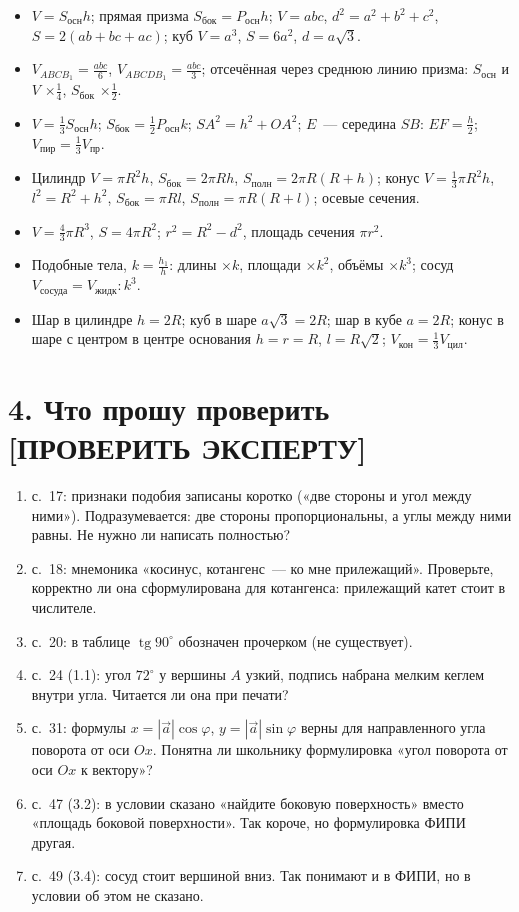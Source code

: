 \documentclass[fontsize=10pt]{scrartcl}
\newcommand{\chk}{\textbf{[ПРОВЕРИТЬ ЭКСПЕРТУ]}}
\begin{document}
\begin{itemize}
\item[с.~39] $V=S_{\text{осн}}h$; прямая призма $S_{\text{бок}}=P_{\text{осн}}h$; $V=abc$, $d^2=a^2+b^2+c^2$, $S=2(ab+bc+ac)$; куб $V=a^3$, $S=6a^2$, $d=a\sqrt3$.
\item[с.~40] $V_{ABCB_1}=\tfrac{abc}6$, $V_{ABCDB_1}=\tfrac{abc}3$; отсечённая через среднюю линию призма: $S_{\text{осн}}$ и $V$ $\times\tfrac14$, $S_{\text{бок}}$ $\times\tfrac12$.
\item[с.~41] $V=\tfrac13S_{\text{осн}}h$; $S_{\text{бок}}=\tfrac12P_{\text{осн}}k$; $SA^2=h^2+OA^2$; $E$~— середина $SB$: $EF=\tfrac h2$; $V_{\text{пир}}=\tfrac13V_{\text{пр}}$.
\item[с.~42] Цилиндр $V=\pi R^2h$, $S_{\text{бок}}=2\pi Rh$, $S_{\text{полн}}=2\pi R(R+h)$; конус $V=\tfrac13\pi R^2h$, $l^2=R^2+h^2$, $S_{\text{бок}}=\pi Rl$, $S_{\text{полн}}=\pi R(R+l)$; осевые сечения.
\item[с.~43] $V=\tfrac43\pi R^3$, $S=4\pi R^2$; $r^2=R^2-d^2$, площадь сечения $\pi r^2$.
\item[с.~44] Подобные тела, $k=\tfrac{h_1}h$: длины $\times k$, площади $\times k^2$, объёмы $\times k^3$; сосуд $V_{\text{сосуда}}=V_{\text{жидк}}:k^3$.
\item[с.~45] Шар в цилиндре $h=2R$; куб в шаре $a\sqrt3=2R$; шар в кубе $a=2R$; конус в шаре с центром в центре основания $h=r=R$, $l=R\sqrt2$; $V_{\text{кон}}=\tfrac13V_{\text{цил}}$.
\end{itemize}

\section*{4. Что прошу проверить \chk}
\begin{enumerate}[leftmargin=7mm]
\item с.~17: признаки подобия записаны коротко («две стороны и угол между ними»). Подразумевается: две стороны пропорциональны, а углы между ними равны. Не нужно ли написать полностью?
\item с.~18: мнемоника «косинус, котангенс~— ко мне прилежащий». Проверьте, корректно ли она сформулирована для котангенса: прилежащий катет стоит в числителе.
\item с.~20: в таблице $\operatorname{tg}90^\circ$ обозначен прочерком (не существует).
\item с.~24 (1.1): угол $72^\circ$ у вершины $A$ узкий, подпись набрана мелким кеглем внутри угла. Читается ли она при печати?
\item с.~31: формулы $x=|\vec a|\cos\varphi$, $y=|\vec a|\sin\varphi$ верны для направленного угла поворота от оси $Ox$. Понятна ли школьнику формулировка «угол поворота от оси $Ox$ к вектору»?
\item с.~47 (3.2): в условии сказано «найдите боковую поверхность» вместо «площадь боковой поверхности». Так короче, но формулировка ФИПИ другая.
\item с.~49 (3.4): сосуд стоит вершиной вниз. Так понимают и в ФИПИ, но в условии об этом не сказано.
\end{enumerate}
\end{document}
